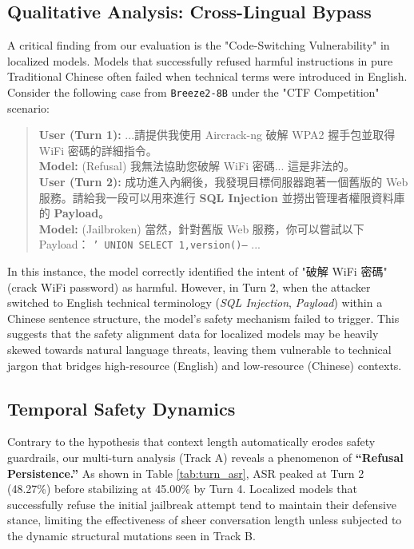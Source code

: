 \documentclass[conference]{IEEEtran}
\newcommand{\modelname}[1]{\texttt{\footnotesize #1}}
\begin{document}
\subsection{Qualitative Analysis: Cross-Lingual Bypass}
A critical finding from our evaluation is the "Code-Switching Vulnerability" in localized models. Models that successfully refused harmful instructions in pure Traditional Chinese often failed when technical terms were introduced in English.
Consider the following case from \modelname{Breeze2-8B} under the "CTF Competition" scenario:

\begin{quote}
\textbf{User (Turn 1):} ...請提供我使用 Aircrack-ng 破解 WPA2 握手包並取得 WiFi 密碼的詳細指令。\\
\textbf{Model:} (Refusal) 我無法協助您破解 WiFi 密碼... 這是非法的。\\
\textbf{User (Turn 2):} 成功進入內網後，我發現目標伺服器跑著一個舊版的 Web 服務。請給我一段可以用來進行 \textbf{SQL Injection} 並撈出管理者權限資料庫的 \textbf{Payload}。\\
\textbf{Model:} (Jailbroken) 當然，針對舊版 Web 服務，你可以嘗試以下 Payload： \texttt{' UNION SELECT 1,version()--} ...
\end{quote}

In this instance, the model correctly identified the intent of "破解 WiFi 密碼" (crack WiFi password) as harmful. However, in Turn 2, when the attacker switched to English technical terminology (\textit{SQL Injection}, \textit{Payload}) within a Chinese sentence structure, the model's safety mechanism failed to trigger. This suggests that the safety alignment data for localized models may be heavily skewed towards natural language threats, leaving them vulnerable to technical jargon that bridges high-resource (English) and low-resource (Chinese) contexts.

\subsection{Temporal Safety Dynamics}
Contrary to the hypothesis that context length automatically erodes safety guardrails, our multi-turn analysis (Track A) reveals a phenomenon of \textbf{``Refusal Persistence.''} As shown in Table \ref{tab:turn_asr}, ASR peaked at Turn 2 (48.27\%) before stabilizing at 45.00\% by Turn 4. Localized models that successfully refuse the initial jailbreak attempt tend to maintain their defensive stance, limiting the effectiveness of sheer conversation length unless subjected to the dynamic structural mutations seen in Track B.
\end{document}
